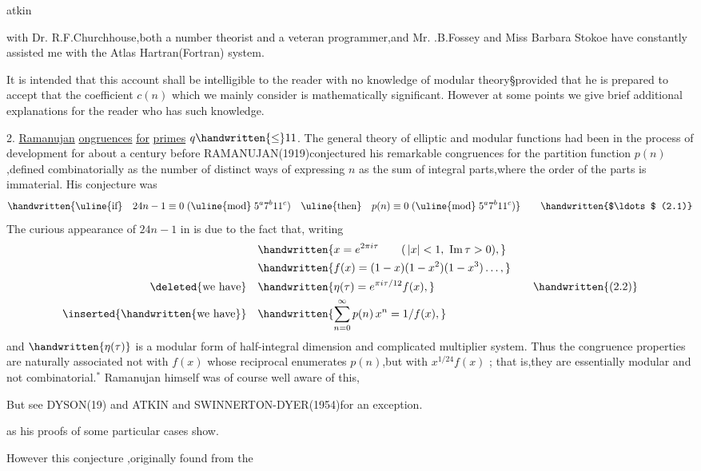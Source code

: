 \noindent\hfill atkin 

\noindent with Dr. R.F.Churchhouse,both a number theorist and a veteran programmer,and Mr. .B.Fossey and Miss Barbara Stokoe have constantly assisted me with the Atlas Hartran(Fortran) system.

It is intended that this account shall be intelligible to the reader with no knowledge of modular theory\S{}\inserted{\handwritten{,}}provided that he is prepared to accept that the coefficient \uline{$c(n)$} which we mainly consider is mathematically significant. However at some points we give brief additional explanations for the reader who has such knowledge.

\noindent\margin{\handwritten{/}}2. \uline{Ramanujan} \uline{ongruences} \uline{for} \uline{primes} $q\handwritten{\leq}11$. The general theory of elliptic and modular functions had been in the process of development for about a century before RAMANUJAN(1919)conjectured his remarkable congruences for the partition function \uline{$p(n)$},defined combinatorially as the number of distinct ways of expressing \uline{$n$} as the sum of integral parts,where the order of the parts is immaterial. His conjecture was
\[
\handwritten{\text{\uline{if}}\quad 24n-1\equiv0\;(\text{\uline{mod}}\;5^{a}7^{b}11^{c})\quad
\text{\uline{then}}\quad p(n)\equiv0\;(\text{\uline{mod}}\;5^{a}7^{b}11^{c})}
\tag*{\handwritten{$\ldots$ (2.1)}}
\]
The curious appearance of $24n-1$ in  is due to the fact that, writing
\[
\begin{aligned}
&\handwritten{x=e^{2\pi i\tau}\qquad (\,|x|<1,\ \mathrm{Im}\,\tau>0),}\\
&\handwritten{f(x)=(1-x)(1-x^{2})(1-x^{3})\ldots,}\\
\text{\deleted{we have}}\quad &\handwritten{\eta(\tau)=e^{\pi i\tau/12}f(x),}\\
\text{\inserted{\handwritten{we have}}}\quad &\handwritten{\sum_{n=0}^{\infty}p(n)\,x^{n}=1/f(x),}
\end{aligned}
\tag*{\handwritten{(2.2)}}
\]
and $\handwritten{\eta(\tau)}$ is a modular form of half-integral dimension and complicated multiplier system. Thus the congruence properties are naturally associated not with \uline{$f(x)$} whose reciprocal enumerates \uline{$p(n)$},but with \uline{$x^{1/24}f(x)$} ; that is,they are essentially modular and not combinatorial.$^{*}$ Ramanujan himself was of course well aware of this,

\noindent\handwritten{\rule{\linewidth}{0.4pt}}

\noindent{}

\noindent *But see DYSON(19) and ATKIN and SWINNERTON-DYER(1954)for an exception.

\noindent\handwritten{\rule{\linewidth}{0.4pt}}

\noindent as his proofs of some particular cases show.

However this conjecture ,originally found from the

